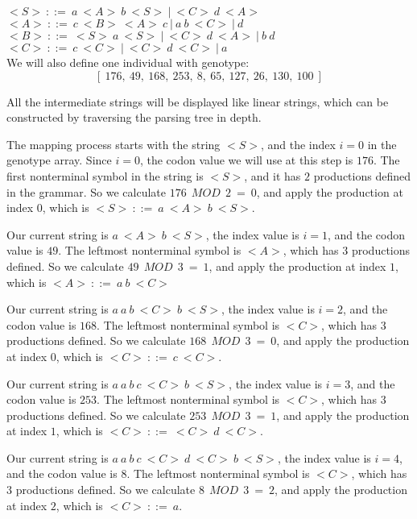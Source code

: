 \noindent
$ {<}S{>}\:::=\:a\:{<}A{>}\:b\:{<}S{>}\:|\:{<}C{>}\:d\:{<}A{>}\:$\\
$ {<}A{>}\:::=\:c\:{<}B{>}\:{<}A{>}\:c\:|\:a\:b\:{<}C{>}\:|\:d $\\
$ {<}B{>}\:::=\:{<}S{>}\:a\:{<}S{>}\:|\:{<}C{>}\:d\:{<}A{>}\:|\:b\:d $\\
$ {<}C{>}\:::=\:c\:{<}C{>}\:|\:{<}C{>}\:d\:{<}C{>}\:|\:a $\\

We will also define one individual with genotype: 
$$ [\:176,\:49,\:168,\:253,\:8,\:65,\:127,\:26,\:130,\:100\:] $$

All the intermediate strings will be displayed like linear strings, which can be constructed by traversing the parsing tree in depth.

The mapping process starts with the string ${<}S{>}$, and the index $i = 0$ in the genotype array. Since $i = 0$, the codon value we will use at this step is $176$. The first nonterminal symbol in the string is ${<}S{>}$, and it has $2$ productions defined in the grammar. So we calculate $176\:\:MOD\:\:2\:=\:0$, and apply the production at index $0$, which is ${<}S{>}\:::=\:a\:{<}A{>}\:b\:{<}S{>}$.

Our current string is $a\:{<}A{>}\:b\:{<}S{>}$, the index value is $i = 1$, and the codon value is $49$. The leftmost nonterminal symbol is ${<}A{>}$, which has $3$ productions defined. So we calculate $49\:\:MOD\:\:3\:=\:1$, and apply the production at index $1$, which is ${<}A{>}\:::=\:a\:b\:{<}C{>}$

Our current string is $a\:a\:b\:{<}C{>}\:b\:{<}S{>}$, the index value is $i = 2$, and the codon value is $168$. The leftmost nonterminal symbol is ${<}C{>}$, which has $3$ productions defined. So we calculate $168\:\:MOD\:\:3\:=\:0$, and apply the production at index $0$, which is ${<}C{>}\:::=\:c\:{<}C{>}$.

Our current string is $a\:a\:b\:c\:{<}C{>}\:b\:{<}S{>}$, the index value is $i = 3$, and the codon value is $253$. The leftmost nonterminal symbol is ${<}C{>}$, which has $3$ productions defined. So we calculate $253\:\:MOD\:\:3\:=\:1$, and apply the production at index $1$, which is ${<}C{>}\:::=\:{<}C{>}\:d\:{<}C{>}$.

Our current string is $a\:a\:b\:c\:{<}C{>}\:d\:{<}C{>}\:b\:{<}S{>}$, the index value is $i = 4$, and the codon value is $8$. The leftmost nonterminal symbol is ${<}C{>}$, which has $3$ productions defined. So we calculate $8\:\:MOD\:\:3\:=\:2$, and apply the production at index $2$, which is ${<}C{>}\:::=\:a$.

